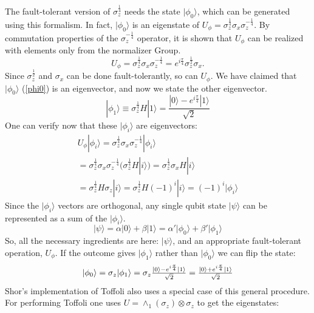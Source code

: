 \documentclass[twocolumn,11pt]{article}
\begin{document}
The fault-tolerant version of $\sigma_z^{\frac{1}{4}}$ needs 
the state $|\phi_0\rangle$, which can be generated using this formalism.  
In fact, $|\phi_0\rangle$ is an eigenstate of 
$U_\phi=\sigma_z^{\frac{1}{4}}\sigma_x\sigma_z^{-\frac{1}{4}}$.  
By commutation properties of 
 the $\sigma_z^{-\frac{1}{4}}$ operator, it is 
shown that $U_\phi$ can be realized with elements only from the normalizer Group.
\begin{equation}
U_\phi=\sigma_z^{\frac{1}{4}}\sigma_x\sigma_z^{-\frac{1}{4}}=
e^{i\frac{\pi}{4}}\sigma_z^{\frac{1}{2}}\sigma_x .
\end{equation}
Since $\sigma_z^{\frac{1}{2}}$ and $\sigma_x$ can be done fault-tolerantly, 
so can $U_\phi$.  We have claimed that $|\phi_0\rangle$ (\ref{phi0}) 
is an eigenvector, and now we state the other eigenvector.
\begin{equation}\label{phi1}
|\phi_1\rangle\equiv\sigma_z^{\frac{1}{4}}H|1\rangle=
\frac{|0\rangle - e^{i\frac{\pi}{4}}|1\rangle}{\sqrt{2}}
\end{equation}
One can verify now that these $|\phi_i\rangle$ are eigenvectors:
\begin{equation}
\begin{split}
U_\phi|\phi_i\rangle=\sigma_z^{\frac{1}{4}}
\sigma_x\sigma_z^{-\frac{1}{4}}|\phi_i\rangle \\ 
=\sigma_z^{\frac{1}{4}}\sigma_x\sigma_z^{-\frac{1}{4}}
(\sigma_z^{\frac{1}{4}}H|i\rangle)=\sigma_z^{\frac{1}{4}}
\sigma_x H|i\rangle \\ =\sigma_z^{\frac{1}{4}}H\sigma_z|i\rangle=
\sigma_z^{\frac{1}{4}}H(-1)^{i}|i\rangle=(-1)^{i}|\phi_i\rangle
\end{split}
\end{equation}
Since the $|\phi_i\rangle$ vectors are orthogonal, any single qubit state 
$|\psi\rangle$ can be represented as a sum of the $|\phi_i\rangle$.
\begin{equation}
|\psi\rangle=\alpha|0\rangle+\beta|1\rangle=
\alpha'|\phi_0\rangle+\beta'|\phi_1\rangle
\end{equation}
So, all the necessary ingredients are here: 
$|\psi\rangle$, and an appropriate fault-tolerant operation, $U_\phi$.  
If the outcome gives $|\phi_1\rangle$ rather than $|\phi_0\rangle$ 
we can flip the state:
\begin{equation}
\mbox{$ |\phi_0\rangle=\sigma_z|\phi_1\rangle=\sigma_z\frac{|0\rangle - 
e^{i\frac{\pi}{4}}|1\rangle}{\sqrt{2}}=\frac{|0\rangle + 
e^{i\frac{\pi}{4}}|1\rangle}{\sqrt{2}} $}
\end{equation}
Shor's implementation of Toffoli \cite{shorFT} also uses a special
case of this general procedure.  For performing Toffoli one uses
$U=\wedge_1(\sigma_z)\otimes\sigma_z$ to get the eigenstates:
\end{document}
